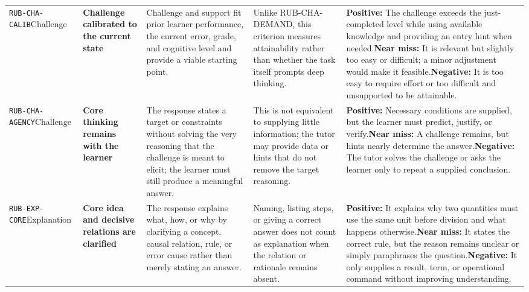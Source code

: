 \documentclass[conference]{IEEEtran}
\begin{document}
\begin{longtable}{P{0.14\textwidth}P{0.17\textwidth}P{0.20\textwidth}P{0.17\textwidth}P{0.24\textwidth}}
\texttt{RUB-CHA-CALIB}\newline{}Challenge & \textbf{Challenge calibrated to the current state} & Challenge and support fit prior learner performance, the current error, grade, and cognitive level and provide a viable starting point. & Unlike RUB-CHA-DEMAND, this criterion measures attainability rather than whether the task itself prompts deep thinking. & \textbf{Positive:} The challenge exceeds the just-completed level while using available knowledge and providing an entry hint when needed.\newline\textbf{Near miss:} It is relevant but slightly too easy or difficult; a minor adjustment would make it feasible.\newline\textbf{Negative:} It is too easy to require effort or too difficult and unsupported to be attainable. \\
\texttt{RUB-CHA-AGENCY}\newline{}Challenge & \textbf{Core thinking remains with the learner} & The response states a target or constraints without solving the very reasoning that the challenge is meant to elicit; the learner must still produce a meaningful answer. & This is not equivalent to supplying little information; the tutor may provide data or hints that do not remove the target reasoning. & \textbf{Positive:} Necessary conditions are supplied, but the learner must predict, justify, or verify.\newline\textbf{Near miss:} A challenge remains, but hints nearly determine the answer.\newline\textbf{Negative:} The tutor solves the challenge or asks the learner only to repeat a supplied conclusion. \\
\texttt{RUB-EXP-CORE}\newline{}Explanation & \textbf{Core idea and decisive relations are clarified} & The response explains what, how, or why by clarifying a concept, causal relation, rule, or error cause rather than merely stating an answer. & Naming, listing steps, or giving a correct answer does not count as explanation when the relation or rationale remains absent. & \textbf{Positive:} It explains why two quantities must use the same unit before division and what happens otherwise.\newline\textbf{Near miss:} It states the correct rule, but the reason remains unclear or simply paraphrases the question.\newline\textbf{Negative:} It only supplies a result, term, or operational command without improving understanding. \\

\end{longtable}
\end{document}

